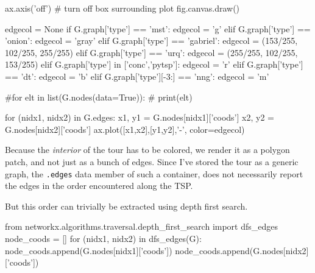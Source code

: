      ax.axis('off') # turn off box surrounding plot
     fig.canvas.draw()
\nwendcode{}\nwdocspar

\nwenddocs{}\endmoddef\nwstartdeflinemarkup{}\nwenddeflinemarkup
edgecol = None
if G.graph['type'] == 'mst':
     edgecol = 'g'
elif G.graph['type'] == 'onion':
     edgecol = 'gray'
elif G.graph['type'] == 'gabriel':
     edgecol = (153/255, 102/255, 255/255)
elif G.graph['type'] == 'urq':
     edgecol = (255/255, 102/255, 153/255)
elif G.graph['type'] in ['conc','pytsp']:
     edgecol = 'r'
elif G.graph['type'] == 'dt':
     edgecol = 'b'
elif G.graph['type'][-3:] == 'nng':
     edgecol = 'm'
\nwendcode{}\nwdocspar


\nwenddocs{}\endmoddef\nwstartdeflinemarkup{}\nwenddeflinemarkup

#for elt in list(G.nodes(data=True)):
#     print(elt)

for  (nidx1, nidx2) in G.edges:
    x1, y1 = G.nodes[nidx1]['coods']
    x2, y2 = G.nodes[nidx2]['coods']
    ax.plot([x1,x2],[y1,y2],'-', color=edgecol)
\nwendcode{}\nwdocspar

Because the \textit{interior} of the tour has to be colored, we render it as a polygon patch, and not
just as a bunch of edges. Since I've stored the tour as a generic graph, 
the \verb|.edges| data member of such a container, does not necessarily report 
the edges in the order encountered along the TSP. 

But this order can trivially be extracted using depth first search. 

\nwenddocs{}\endmoddef\nwstartdeflinemarkup{}\nwenddeflinemarkup
from networkx.algorithms.traversal.depth_first_search import dfs_edges
node_coods = []
for (nidx1, nidx2) in dfs_edges(G):
       node_coods.append(G.nodes[nidx1]['coods'])
       node_coods.append(G.nodes[nidx2]['coods'])

